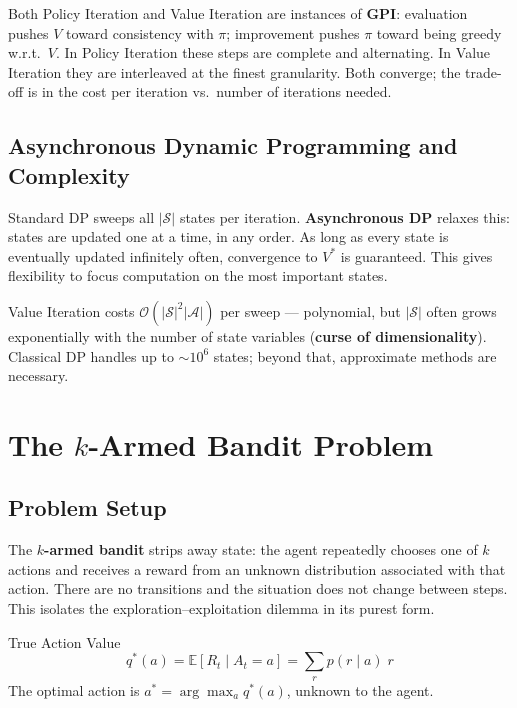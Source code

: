 \documentclass[11pt,a4paper]{article}
\newcommand{\E}{\mathbb{E}}
\newcommand{\term}[1]{\textcolor{DefGreen}{\textbf{#1}}}
\begin{document}
\begin{insightbox}
Both Policy Iteration and Value Iteration are instances of \term{GPI}: evaluation pushes $V$ toward consistency with $\pi$; improvement pushes $\pi$ toward being greedy w.r.t.\ $V$. In Policy Iteration these steps are complete and alternating. In Value Iteration they are interleaved at the finest granularity. Both converge; the trade-off is in the cost per iteration vs.\ number of iterations needed.
\end{insightbox}

\subsection{Asynchronous Dynamic Programming and Complexity}

Standard DP sweeps all $|\mathcal{S}|$ states per iteration. \term{Asynchronous DP} relaxes this: states are updated one at a time, in any order. As long as every state is eventually updated infinitely often, convergence to $V^*$ is guaranteed. This gives flexibility to focus computation on the most important states.

Value Iteration costs $\mathcal{O}(|\mathcal{S}|^2 |\mathcal{A}|)$ per sweep --- polynomial, but $|\mathcal{S}|$ often grows exponentially with the number of state variables (\term{curse of dimensionality}). Classical DP handles up to $\sim 10^6$ states; beyond that, approximate methods are necessary.

\section{The $k$-Armed Bandit Problem}

\subsection{Problem Setup}

The \term{$k$-armed bandit} strips away state: the agent repeatedly chooses one of $k$ actions and receives a reward from an unknown distribution associated with that action. There are no transitions and the situation does not change between steps. This isolates the exploration--exploitation dilemma in its purest form.

\begin{defbox}{True Action Value}
\[
q^*(a) = \E[R_t \mid A_t = a] = \sum_r p(r\mid a)\;r
\]
The optimal action is $a^* = \arg\max_a q^*(a)$, unknown to the agent.
\end{defbox}
\end{document}
